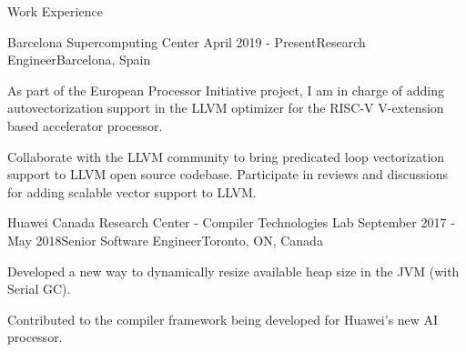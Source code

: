 \documentclass{resume} %
\begin{document}
\begin{rSection}{Work Experience}

\begin{rSubsection}{Barcelona Supercomputing Center}
	{April 2019 - Present}{Research Engineer}{Barcelona, Spain}
\item As part of the European Processor Initiative project, I am in charge of
	adding autovectorization support in the LLVM optimizer for the
	RISC-V V-extension based accelerator processor.
\item Collaborate with the LLVM community to bring predicated loop vectorization
  support to LLVM open source codebase. Participate in reviews and
  discussions for adding scalable vector support to LLVM.
\end{rSubsection}

\begin{rSubsection}{Huawei Canada Research Center - Compiler Technologies Lab}
	{September 2017 - May 2018}{Senior Software Engineer}{Toronto, ON, Canada}
\item Developed a new way to dynamically resize available heap size in the JVM (with Serial GC).
\item Contributed to the compiler framework being developed for Huawei's new AI processor.
\end{rSubsection}


\end{rSection}
\end{document}
